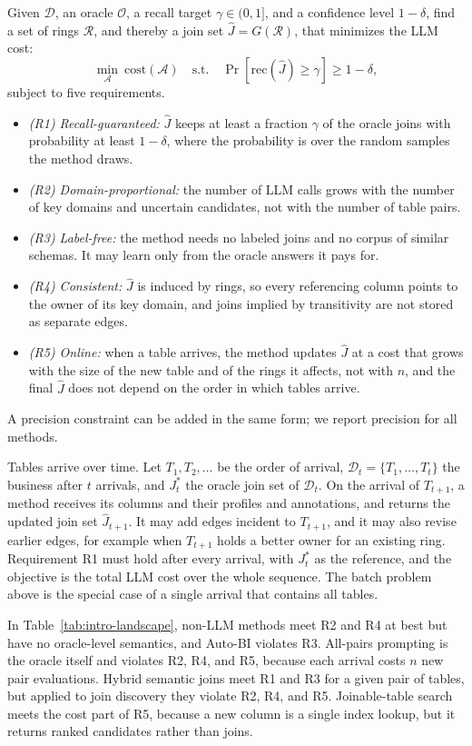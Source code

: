  Given $\mathcal{D}$, an oracle $\mathcal{O}$, a recall target $\gamma \in (0, 1]$, and a confidence level $1-\delta$, find a set of rings $\mathcal{R}$, and thereby a join set $\hat{J} = G(\mathcal{R})$, that minimizes the LLM cost:
\begin{equation}
\min_{\mathcal{A}} \ \mathrm{cost}(\mathcal{A}) \quad \text{s.t.} \quad \Pr\left[\mathrm{rec}(\hat{J}) \geq \gamma\right] \geq 1 - \delta,
\end{equation}
subject to five requirements.
\begin{itemize}[leftmargin=*]
\item \emph{(R1) Recall-guaranteed:} $\hat{J}$ keeps at least a fraction $\gamma$ of the oracle joins with probability at least $1-\delta$, where the probability is over the random samples the method draws.
\item \emph{(R2) Domain-proportional:} the number of LLM calls grows with the number of key domains and uncertain candidates, not with the number of table pairs.
\item \emph{(R3) Label-free:} the method needs no labeled joins and no corpus of similar schemas. It may learn only from the oracle answers it pays for.
\item \emph{(R4) Consistent:} $\hat{J}$ is induced by rings, so every referencing column points to the owner of its key domain, and joins implied by transitivity are not stored as separate edges.
\item \emph{(R5) Online:} when a table arrives, the method updates $\hat{J}$ at a cost that grows with the size of the new table and of the rings it affects, not with $n$, and the final $\hat{J}$ does not depend on the order in which tables arrive.
\end{itemize}
A precision constraint can be added in the same form; we report precision for all methods.

 Tables arrive over time.
Let $T_1, T_2, \ldots$ be the order of arrival, $\mathcal{D}_t = \{T_1, \ldots, T_t\}$ the business after $t$ arrivals, and $J^*_t$ the oracle join set of $\mathcal{D}_t$.
On the arrival of $T_{t+1}$, a method receives its columns and their profiles and annotations, and returns the updated join set $\hat{J}_{t+1}$.
It may add edges incident to $T_{t+1}$, and it may also revise earlier edges, for example when $T_{t+1}$ holds a better owner for an existing ring.
Requirement R1 must hold after every arrival, with $J^*_t$ as the reference, and the objective is the total LLM cost over the whole sequence.
The batch problem above is the special case of a single arrival that contains all tables.

In Table~\ref{tab:intro-landscape}, non-LLM methods meet R2 and R4 at best but have no oracle-level semantics, and Auto-BI violates R3.
All-pairs prompting is the oracle itself and violates R2, R4, and R5, because each arrival costs $n$ new pair evaluations.
Hybrid semantic joins meet R1 and R3 for a given pair of tables, but applied to join discovery they violate R2, R4, and R5.
Joinable-table search meets the cost part of R5, because a new column is a single index lookup, but it returns ranked candidates rather than joins.
